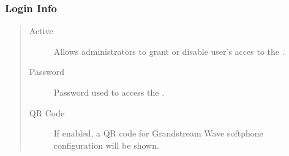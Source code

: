 \documentclass[letterpaper,10pt,spanish]{sphinxmanual}
\begin{document}
\subsubsection{Login Info}
\label{administration_portal/client/vpbx/users:login-info}\begin{quote}
\begin{description}
\item[{Active}] \leavevmode
Allows administrators to grant or disable user's acces to the
{\hyperref[user_portal/index:userportal]{}}.

\item[{Password}] \leavevmode
Password used to access the {\hyperref[user_portal/index:userportal]{}}.

\item[{QR Code}] \leavevmode
If enabled, a QR code for Grandstream Wave softphone configuration
will be shown.

\end{description}
\end{quote}
\end{document}
